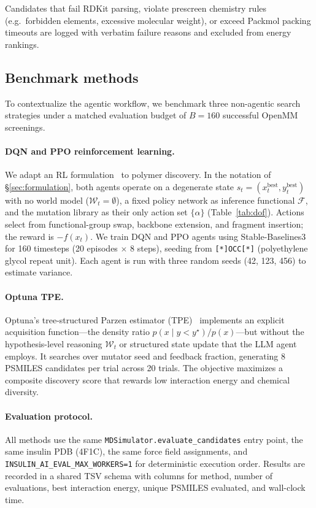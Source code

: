 \documentclass[twocolumn]{fairmeta}
\begin{document}
Candidates that fail RDKit parsing, violate prescreen chemistry rules (e.g.\ forbidden elements, excessive molecular weight), or exceed Packmol packing timeouts are logged with verbatim failure reasons and excluded from energy rankings.

\subsection{Benchmark methods}
\label{sec:benchmark_methods}

To contextualize the agentic workflow, we benchmark three non-agentic search strategies under a matched evaluation budget of $B{=}160$ successful OpenMM screenings.

\paragraph{DQN and PPO reinforcement learning.}
We adapt an RL formulation~\cite{boiko2023autonomous} to polymer discovery.
In the notation of \S\ref{sec:formulation}, both agents operate on a degenerate state $s_t = (x_t^\text{best}, y_t^\text{best})$ with no world model ($\mathcal{W}_t = \emptyset$), a fixed policy network as inference functional $\mathcal{F}$, and the mutation library as their only action set $\{\alpha\}$ (Table~\ref{tab:dof}).
Actions select from functional-group swap, backbone extension, and fragment insertion; the reward is $-f(x_t)$.
We train DQN and PPO agents using Stable-Baselines3~\cite{sb3_2021} for 160 timesteps (20 episodes $\times$ 8 steps), seeding from \texttt{[*]OCC[*]} (polyethylene glycol repeat unit).
Each agent is run with three random seeds (42, 123, 456) to estimate variance.

\paragraph{Optuna TPE.}
Optuna's tree-structured Parzen estimator (TPE)~\cite{optuna2019} implements an explicit acquisition function---the density ratio $p(x \mid y < y^\star) / p(x)$---but without the hypothesis-level reasoning $\mathcal{W}_t$ or structured state update that the LLM agent employs.
It searches over mutator seed and feedback fraction, generating 8 PSMILES candidates per trial across 20 trials.
The objective maximizes a composite discovery score that rewards low interaction energy and chemical diversity.

\paragraph{Evaluation protocol.}
All methods use the same \texttt{MDSimulator.evaluate\_candidates} entry point, the same insulin PDB (4F1C), the same force field assignments, and \texttt{INSULIN\_AI\_EVAL\_MAX\_WORKERS=1} for deterministic execution order.
Results are recorded in a shared TSV schema with columns for method, number of evaluations, best interaction energy, unique PSMILES evaluated, and wall-clock time.
\end{document}
